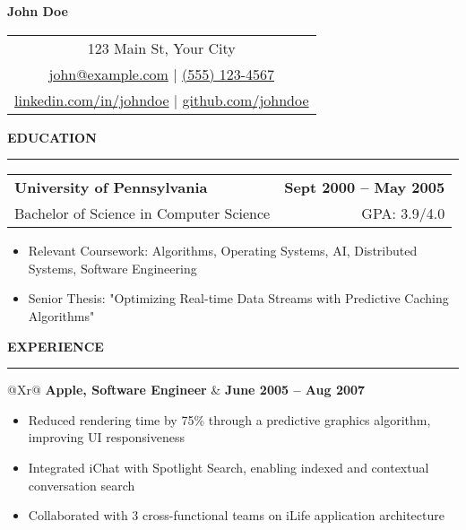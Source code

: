 \documentclass[10pt, letterpaper]{article}
\newcommand{\sectiontitle}[1]{
  \vspace{0.5cm}
  {\Large\color{primary}\textbf{#1}}
  \vspace{0.2cm}\hrule
  \vspace{0.3cm}
}
\begin{document}
\begin{center}
  {\Huge\bfseries John Doe}\\[0.3cm]
  \begin{tabular}{@{}c@{}}
    123 Main St, Your City \\ 
    \href{mailto:john@example.com}{john@example.com} | 
    \href{tel:+15551234567}{(555) 123-4567} \\ 
    \href{https://linkedin.com/in/johndoe}{linkedin.com/in/johndoe} | 
    \href{https://github.com/johndoe}{github.com/johndoe}
  \end{tabular}
\end{center}

\sectiontitle{EDUCATION}

\begin{tabularx}{\textwidth}{@{}Xr@{}}
  \textbf{University of Pennsylvania} & \textbf{Sept 2000 -- May 2005} \\
  Bachelor of Science in Computer Science & GPA: 3.9/4.0 \\
\end{tabularx}
\begin{itemize}[leftmargin=*, nosep]
  \item Relevant Coursework: Algorithms, Operating Systems, AI, Distributed Systems, Software Engineering
  \item Senior Thesis: "Optimizing Real-time Data Streams with Predictive Caching Algorithms"
\end{itemize}

\sectiontitle{EXPERIENCE}

\begin{tabularx}{\textwidth}{@{}Xr@{}}
  \textbf{Apple, Software Engineer} & \textbf{June 2005 -- Aug 2007} \\
\end{tabularx}
\begin{itemize}[leftmargin=*, nosep]
  \item Reduced rendering time by 75\% through a predictive graphics algorithm, improving UI responsiveness
  \item Integrated iChat with Spotlight Search, enabling indexed and contextual conversation search
  \item Collaborated with 3 cross-functional teams on iLife application architecture
\end{itemize}

\vspace{0.3cm}
\end{document}
